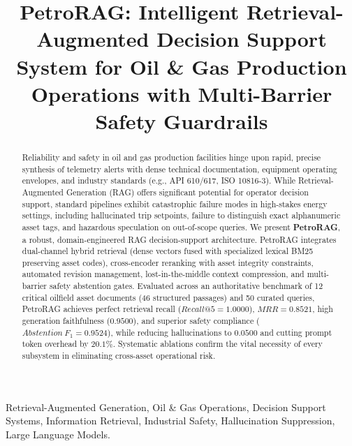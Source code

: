 \documentclass[conference]{IEEEtran}
\begin{document}
\title{PetroRAG: Intelligent Retrieval-Augmented Decision Support System for Oil \& Gas Production Operations with Multi-Barrier Safety Guardrails}

\author{
}

\maketitle

\begin{abstract}
Reliability and safety in oil and gas production facilities hinge upon rapid, precise synthesis of telemetry alerts with dense technical documentation, equipment operating envelopes, and industry standards (e.g., API 610/617, ISO 10816-3). While Retrieval-Augmented Generation (RAG) offers significant potential for operator decision support, standard pipelines exhibit catastrophic failure modes in high-stakes energy settings, including hallucinated trip setpoints, failure to distinguish exact alphanumeric asset tags, and hazardous speculation on out-of-scope queries. We present \textbf{PetroRAG}, a robust, domain-engineered RAG decision-support architecture. PetroRAG integrates dual-channel hybrid retrieval (dense vectors fused with specialized lexical BM25 preserving asset codes), cross-encoder reranking with asset integrity constraints, automated revision management, lost-in-the-middle context compression, and multi-barrier safety abstention gates. Evaluated across an authoritative benchmark of 12 critical oilfield asset documents (46 structured passages) and 50 curated queries, PetroRAG achieves perfect retrieval recall ($Recall@5 = 1.0000$), $MRR = 0.8521$, high generation faithfulness ($0.9500$), and superior safety compliance ($Abstention\ F_1 = 0.9524$), while reducing hallucinations to $0.0500$ and cutting prompt token overhead by $20.1\%$. Systematic ablations confirm the vital necessity of every subsystem in eliminating cross-asset operational risk.
\end{abstract}

\begin{IEEEkeywords}
Retrieval-Augmented Generation, Oil \& Gas Operations, Decision Support Systems, Information Retrieval, Industrial Safety, Hallucination Suppression, Large Language Models.
\end{IEEEkeywords}










\end{document}
